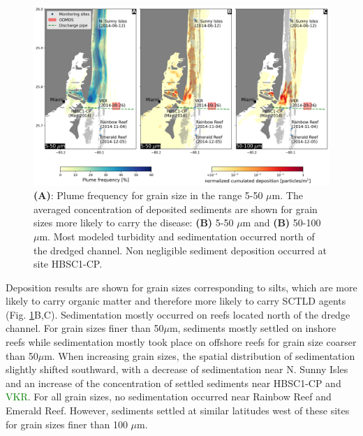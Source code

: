 \documentclass[preprint,12pt,authoryear]{elsarticle}
\newcommand{\modif}[1]{\textcolor{green}{#1}}
\begin{document}
\begin{figure}
	\centering
	\includegraphics[width=\textwidth]{figures/plume_deposition_new_vv.png}
	\caption{\textbf{(A)}: Plume frequency for grain size in the range 5-50 $\mu$m. The averaged concentration of deposited sediments are shown for grain sizes more likely to carry the disease: \textbf{(B)} 5-50 $\mu$m and \textbf{(B)} 50-100 $\mu$m. Most modeled turbidity and sedimentation occurred north of the dredged channel. Non negligible sediment deposition occurred at site HBSC1-CP.}
	\label{fig:onset_depo}
\end{figure}

Deposition results are shown for grain sizes corresponding to silts, which are more likely to carry organic matter and therefore more likely to carry SCTLD agents \citep{erftemeijer2012environmental}(Fig. \ref{fig:onset_depo}B,C). Sedimentation mostly occurred on reefs located north of the dredge channel. For grain sizes finer than 50$\mu$m, sediments mostly settled on inshore reefs while sedimentation mostly took place on offshore reefs for grain size coarser than 50$\mu$m. When increasing grain sizes, the spatial distribution of sedimentation slightly shifted southward, with a decrease of sedimentation near N. Sunny Isles and an increase of the concentration of settled sediments near HBSC1-CP and \modif{VKR}. %
For all grain sizes, no sedimentation occurred near Rainbow Reef and Emerald Reef. However, sediments settled at similar latitudes west of these sites for grain sizes finer than 100 $\mu$m.
\end{document}
